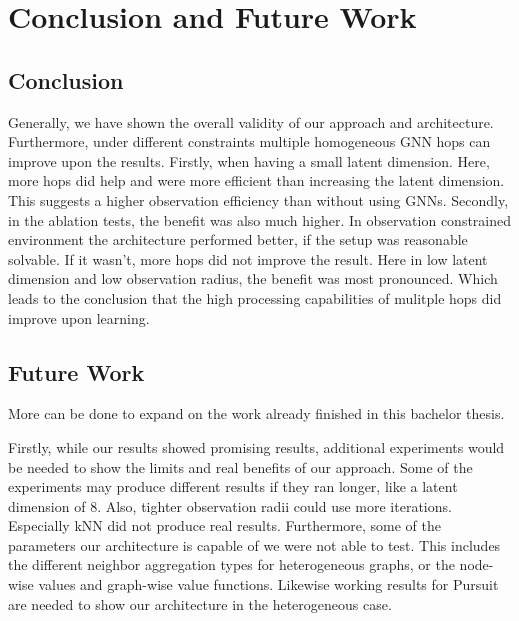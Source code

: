 
\chapter{Conclusion and Future Work}
\label{ch:Conclusion}


\section{Conclusion}
Generally, we have shown the overall validity of our approach and architecture. Furthermore, under different constraints multiple homogeneous GNN hops can improve upon the results. Firstly, when having a small latent dimension. Here, more hops did help and were more efficient than increasing the latent dimension. This suggests a higher observation efficiency than without using GNNs. Secondly, in the ablation tests, the benefit was also much higher. In observation constrained environment the architecture performed better, if the setup was reasonable solvable. If it wasn't, more hops did not improve the result. Here in low latent dimension and low observation radius, the benefit was most pronounced. Which leads to the conclusion that the high processing capabilities of mulitple hops did improve upon learning.

\section{Future Work}
More can be done to expand on the work already finished in this bachelor thesis.\par

Firstly, while our results showed promising results, additional experiments would be needed to show the limits and real benefits of our approach. Some of the experiments may produce different results if they ran longer, like a latent dimension of 8. Also, tighter observation radii could use more iterations. Especially kNN did not produce real results. Furthermore, some of the parameters our architecture is capable of we were not able to test. This includes the different neighbor aggregation types for heterogeneous graphs, or the node-wise values and graph-wise value functions. Likewise working results for Pursuit are needed to show our architecture in the heterogeneous case.

